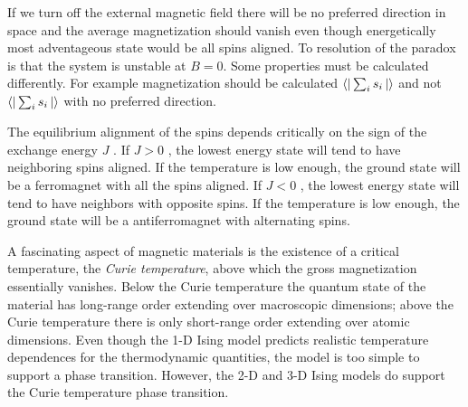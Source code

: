 \documentclass[12pt]{article}
\theoremstyle{plain}
\begin{document}
\par If we turn off the external magnetic field there will be no preferred
direction in space and the average magnetization should vanish even though
energetically most adventageous state would be all spins aligned. To
resolution of the paradox is that the system is unstable at $B=0$. Some properties must be
calculated differently. For example magnetization should be calculated $\bra{}\sum_{i}s_{i}\ket{}$
and not $\bra{}\sum_{i}s_{i}\ket{}$ with no preferred direction.

\par The equilibrium alignment of the spins depends critically on the sign of the exchange
energy $J$ . If $J > 0$ , the lowest energy state will tend to have neighboring spins aligned. If the
temperature is low enough, the ground state will be a ferromagnet with all the spins aligned.
If $J < 0$ , the lowest energy state will tend to have neighbors with opposite spins. If the
temperature is low enough, the ground state will be a antiferromagnet with alternating spins.

\par A fascinating aspect of magnetic materials is the existence of a critical temperature, the
\textit{Curie temperature}, above which the gross magnetization essentially vanishes. Below the Curie
temperature the quantum state of the material has long-range order extending over macroscopic
dimensions; above the Curie temperature there is only short-range order extending over atomic
dimensions. Even though the 1-D Ising model predicts realistic temperature dependences for
the thermodynamic quantities, the model is too simple to support a phase transition. However,
the 2-D and 3-D Ising models do support the Curie temperature phase transition.



\end{document}
